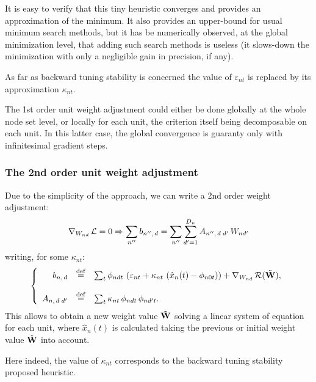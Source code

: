 It is easy to verify that this tiny heuristic converges and provides an approximation of the minimum. It also provides an upper-bound for usual minimum search methods, but it has be numerically observed, at the global minimization level, that adding such search methods is useless (it slows-down the minimization with only a negligible gain in precision, if any).

As far as backward tuning stability is concerned the value of $\varepsilon_{nt}$ is replaced by its approximation $\kappa_{nt}$.

The 1st order unit weight adjustment could either be done globally at the whole node set level, or locally for each unit, the criterion itself being decomposable on each unit. In this latter case, the global convergence is guaranty only with infinitesimal gradient steps.

\subsubsection*{The 2nd order unit weight adjustment}

Due to the simplicity of the approach, we can write a 2nd order weight adjustment:
\[
\nabla_{W_{nd}} \, {\cal L} = 0 \Rightarrow \sum_{n''} b_{n'',\,d} = \sum_{n''} \sum_{d'=1}^{D_{n}} A_{n'',\,d\;d'} \, W_{nd'}
\] writing, for some $\kappa_{nt}$: \[ \left\{ \begin{array}{rcl}
b_{n,\,d} &\stackrel {\rm def}{=}& \sum_t \phi_{ndt} \, \left( \varepsilon_{nt}  + \kappa_{nt} \, \left(\hat{x}_n(t) - \phi_{n0t} \right) \right)  + \nabla_{W_{nd}} \, {\cal R}(\tilde{\bf W}),  \\
&\\
A_{n,\,d\;d'} &\stackrel {\rm def}{=}& \sum_t \kappa_{nt} \, \phi_{ndt} \, \phi_{nd't}.  \\
\end{array} \right. \]
This allows to obtain a new weight value $\tilde{\bf W}$ solving a linear system of equation for each unit, where $\hat{x}_n(t)$ is calculated taking the previous or initial weight value $\hat{\bf W}$ into account.

Here indeed, the value of $\kappa_{nt}$ corresponds to the backward tuning stability proposed heuristic.

